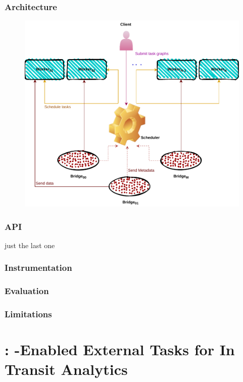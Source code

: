 \subsubsection{Architecture}
\begin{figure}[tb]\centering
\includegraphics{figures/ArchiectureDeisa.pdf}
\caption{\deisa}
\label{figdeida}
\end{figure}


\subsubsection{API}
just the last one 
\subsubsection{Instrumentation}

\subsubsection{Evaluation}
\subsubsection{Limitations}
\section{\deetita: \dask-Enabled External Tasks for In Transit Analytics}


